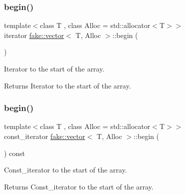 \subsubsection{\texorpdfstring{begin()}{begin()}\hspace{0.1cm}{\footnotesize\ttfamily [1/2]}}
{\footnotesize\ttfamily template$<$class T , class Alloc  = std\+::allocator$<$\+T$>$$>$ \\
iterator \mbox{\hyperlink{classfake_1_1vector}{fake\+::vector}}$<$ T, Alloc $>$\+::begin (\begin{DoxyParamCaption}{ }\end{DoxyParamCaption})\hspace{0.3cm}{\ttfamily [inline]}}



Iterator to the start of the array. 

\begin{DoxyReturn}{Returns}
Iterator to the start of the array. 
\end{DoxyReturn}
\mbox{\label{classfake_1_1vector_ad3567fd79465f31fe2bd26cb2eb85e2b}} 
\subsubsection{\texorpdfstring{begin()}{begin()}\hspace{0.1cm}{\footnotesize\ttfamily [2/2]}}
{\footnotesize\ttfamily template$<$class T , class Alloc  = std\+::allocator$<$\+T$>$$>$ \\
const\+\_\+iterator \mbox{\hyperlink{classfake_1_1vector}{fake\+::vector}}$<$ T, Alloc $>$\+::begin (\begin{DoxyParamCaption}{ }\end{DoxyParamCaption}) const\hspace{0.3cm}{\ttfamily [inline]}}



Const\+\_\+iterator to the start of the array. 

\begin{DoxyReturn}{Returns}
Const\+\_\+iterator to the start of the array. 
\end{DoxyReturn}
\mbox{\label{classfake_1_1vector_ac6314c74adfdadd78ade4d4db2ea3e15}} 

